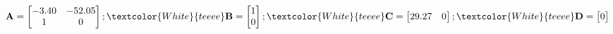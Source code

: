   \begin{equation}
  \label{eq:system_matrices_}
	\mathbf{A}
	 =   
    \begin{bmatrix}
    -3.40 & -52.05 \\
     1 & 0
\end{bmatrix}
;
\textcolor{White}{teeee}
\mathbf{B}
	 =   
    \begin{bmatrix}
    1 \\
    0
\end{bmatrix}
;
\textcolor{White}{teeee}
\mathbf{C}
	 =   
    \begin{bmatrix}
    29.27 & 0
\end{bmatrix}
;
\textcolor{White}{teeee}
\mathbf{D}
	 =   
    \begin{bmatrix}
    0
\end{bmatrix}
  \end{equation}
